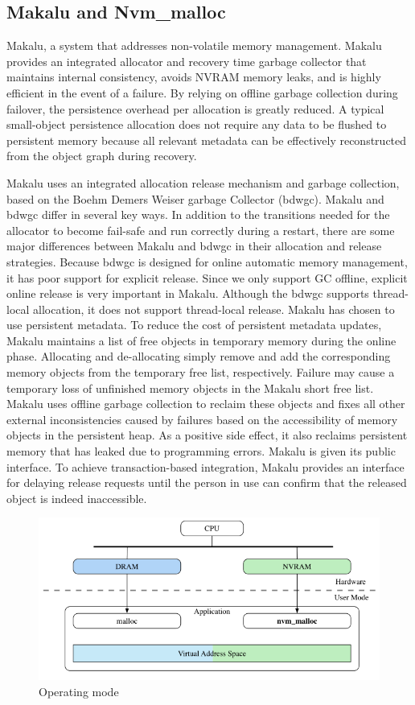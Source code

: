 \documentclass[sigconf]{acmart}
\begin{document}
\subsection{Makalu and Nvm\_malloc}

Makalu, a system that addresses non-volatile memory management. Makalu provides an integrated allocator and recovery time garbage collector that maintains internal consistency, avoids NVRAM memory leaks, and is highly efficient in the event of a failure. By relying on offline garbage collection during failover, the persistence overhead per allocation is greatly reduced. A typical small-object persistence allocation does not require any data to be flushed to persistent memory because all relevant metadata can be effectively reconstructed from the object graph during recovery.

Makalu uses an integrated allocation release mechanism and garbage collection, based on the Boehm Demers Weiser garbage Collector (bdwgc). Makalu and bdwgc differ in several key ways. In addition to the transitions needed for the allocator to become fail-safe and run correctly during a restart, there are some major differences between Makalu and bdwgc in their allocation and release strategies. Because bdwgc is designed for online automatic memory management, it has poor support for explicit release. Since we only support GC offline, explicit online release is very important in Makalu. Although the bdwgc supports thread-local allocation, it does not support thread-local release. Makalu has chosen to use persistent metadata. To reduce the cost of persistent metadata updates, Makalu maintains a list of free objects in temporary memory during the online phase. Allocating and de-allocating simply remove and add the corresponding memory objects from the temporary free list, respectively. Failure may cause a temporary loss of unfinished memory objects in the Makalu short free list. Makalu uses offline garbage collection to reclaim these objects and fixes all other external inconsistencies caused by failures based on the accessibility of memory objects in the persistent heap. As a positive side effect, it also reclaims persistent memory that has leaked due to programming errors. Makalu is given its public interface. To achieve transaction-based integration, Makalu provides an interface for delaying release requests until the person in use can confirm that the released object is indeed inaccessible.
\begin{figure}
	\centering
	\includegraphics[width=0.7\linewidth]{"figure 2"}
	\caption{Operating mode}
	\label{fig:figure 2}
\end{figure}
\end{document}

